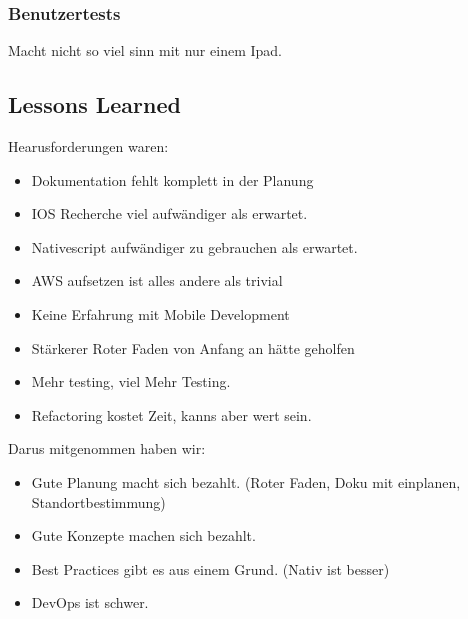 \subsubsection*{Benutzertests}
Macht nicht so viel sinn mit nur einem Ipad.

\clearpage
\subsection{Lessons Learned}

Hearusforderungen waren:
\begin{itemize}
    \item Dokumentation fehlt komplett in der Planung
    \item IOS Recherche viel aufwändiger als erwartet.
    \item Nativescript aufwändiger zu gebrauchen als erwartet.
    \item AWS aufsetzen ist alles andere als trivial
    \item Keine Erfahrung mit Mobile Development
    \item Stärkerer Roter Faden von Anfang an hätte geholfen
    \item Mehr testing, viel Mehr Testing.
    \item Refactoring kostet Zeit, kanns aber wert sein.
\end{itemize}

Darus mitgenommen haben wir:
\begin{itemize}
    \item Gute Planung macht sich bezahlt. (Roter Faden, Doku mit einplanen, Standortbestimmung)
    \item Gute Konzepte machen sich bezahlt.
    \item Best Practices gibt es aus einem Grund. (Nativ ist besser)
    \item DevOps ist schwer.
\end{itemize}





